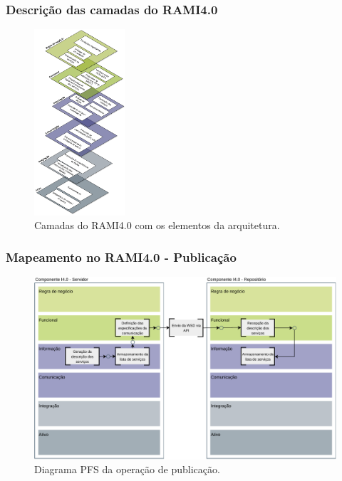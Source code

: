 \documentclass[10pt]{beamer}
\begin{document}
\begin{frame}
	
	\frametitle{Descrição das camadas do RAMI4.0}
	
	\begin{figure}[H]
		\centering
		\caption{Camadas do RAMI4.0 com os elementos da arquitetura.}
		\label{fig:webservice-rami}
		\includegraphics[width=0.3\textwidth]{webservice-rami}
	\end{figure}
	
\end{frame}
\begin{frame}
	
	\frametitle{Mapeamento no RAMI4.0 - Publicação}
	
	\begin{figure}[htb]
		\centering
		\caption{Diagrama PFS da operação de publicação.}
		\label{fig:rami-publicacao}
		\includegraphics[width=1\textwidth]{rami-publicacao}
	\end{figure}
	
\end{frame}
\end{document}
